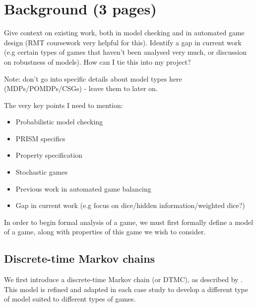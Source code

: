 
\chapter{Background (3 pages)}

Give context on existing work, both in model checking and in automated game design (RMT coursework very helpful for this). Identify a gap in current work (e.g certain types of games that haven't been analysed very much, or discussion on robustness of models). How can I tie this into my project?

Note: don't go into specific details about model types here (MDPs/POMDPs/CSGs) - leave them to later on.

The very key points I need to mention:

\begin{itemize}
    \item Probabilistic model checking
    \item PRISM specifics
    \item Property specification
    \item Stochastic games
    \item Previous work in automated game balancing
    \item Gap in current work (e.g focus on dice/hidden information/weighted dice?)
\end{itemize}

In order to begin formal analysis of a game, we must first formally define a model of a game, along with properties of this game we wish to consider.

\section{Discrete-time Markov chains}
\label{back:stoc_game}

We first introduce a discrete-time Markov chain (or DTMC), as described by \cite{kwiatkowska_stochastic_2007}. This model is refined and adapted in each case study to develop a different type of model suited to different types of games.

